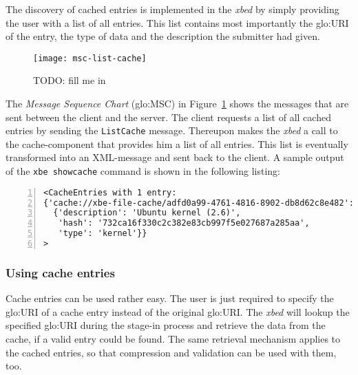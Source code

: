 The  discovery of  cached entries  is  implemented in  the \emph{xbed}  by
simply providing the  user with a list of all  entries. This list contains
most importantly the \gls{glo:URI} of the  entry, the type of data and the
description the submitter had given.

\begin{figure}[ht]
  \centering
  \texttt{[image: msc-list-cache]}
  \caption[MSC List Cache Entries]{TODO: fill me in}
  \label{fig:msc-list-cache}
\end{figure}

The      \emph{Message     Sequence     Chart}      (\gls{glo:MSC})     in
Figure~\ref{fig:msc-list-cache} shows  the messages that  are sent between
the  client and  the server.   The client  requests a  list of  all cached
entries  by sending  the \texttt{ListCache}  message. Thereupon  makes the
\emph{xbed} a call to the cache-component  that provides him a list of all
entries. This list is eventually  transformed into an XML-message and sent
back to the client.  A sample output of the \texttt{xbe showcache} command
is shown in the following listing:

\bigskip

\begin{center}
  \begin{minipage}{.75\textwidth}
    \begin{lstlisting}[captionpos=b,backgroundcolor=\color{listingcolor},frame=lines,numbers=left,numberstyle=\tiny,caption={\emph{xbe} output of cache entries.},label={lst:xbe-listcache-out}]
<CacheEntries with 1 entry:
{'cache://xbe-file-cache/adfd0a99-4761-4816-8902-db8d62c8e482':
  {'description': 'Ubuntu kernel (2.6)',
   'hash': '732ca16f330c2c382e83cb997f5e027687a285aa',
   'type': 'kernel'}}
>
    \end{lstlisting}
  \end{minipage}
\end{center}

\subsubsection{Using cache entries}

Cache  entries can  be used  rather  easy. The  user is  just required  to
specify  the  \gls{glo:URI} of  a  cache  entry  instead of  the  original
\gls{glo:URI}.   The \emph{xbed} will  lookup the  specified \gls{glo:URI}
during the  stage-in process and  retrieve the data  from the cache,  if a
valid entry  could be found. The  same retrieval mechanism  applies to the
cached entries, so that compression  and validation can be used with them,
too.


